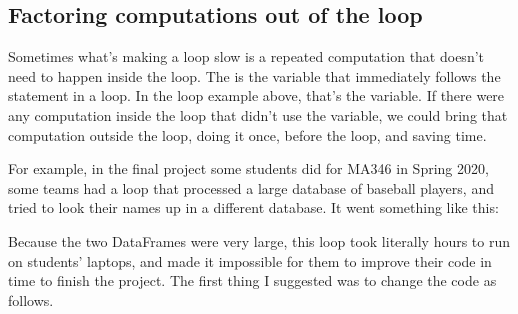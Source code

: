 \documentclass[letterpaper,10pt,english]{sphinxmanual}
\begin{document}
\subsection{Factoring computations out of the loop}
\label{\detokenize{chapter-11-processing-rows:factoring-computations-out-of-the-loop}}
Sometimes what’s making a loop slow is a repeated computation that doesn’t need to happen inside the loop.  The  is the variable that immediately follows the  statement in a loop.  In the loop example above, that’s the  variable.  If there were any computation inside the loop that didn’t use the  variable, we could bring that computation outside the loop, doing it once, before the loop, and saving time.

For example, in the final project some students did for MA346 in Spring 2020, some teams had a loop that processed a large database of baseball players, and tried to look their names up in a different database.  It went something like this:

\begin{sphinxVerbatim}[commandchars=\\\{\}]
   \PYG{p}{[}\PYG{p}{]}
       \PYG{p}{[}\PYG{p}{]}
\end{sphinxVerbatim}

Because the two DataFrames were very large, this loop took literally hours to run on students’ laptops, and made it impossible for them to improve their code in time to finish the project.  The first thing I suggested was to change the code as follows.

\begin{sphinxVerbatim}[commandchars=\\\{\}]
   \PYG{p}{[}\PYG{p}{]}
       \PYG{p}{[}\PYG{p}{]}
\end{sphinxVerbatim}
\end{document}

